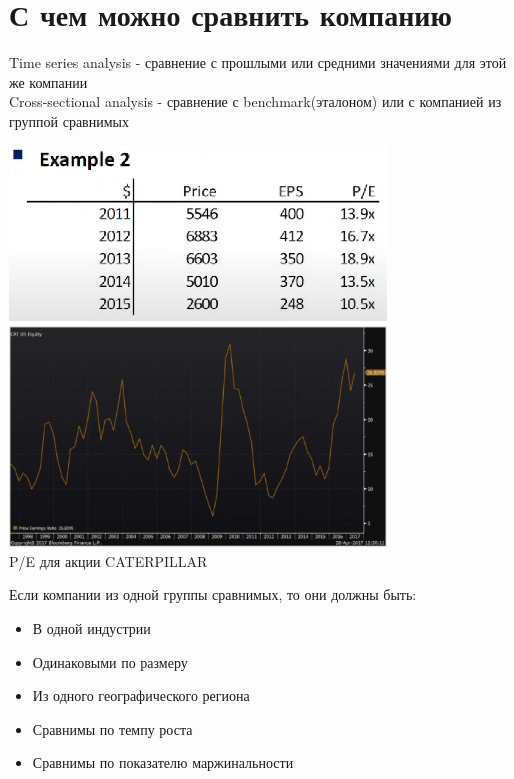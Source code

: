 \documentclass{article}
\begin{document}
\section{С чем можно сравнить компанию}
Time series analysis - сравнение с прошлыми или средними значениями для этой же компании\\
Cross-sectional analysis - сравнение с benchmark(эталоном) или с компанией из группой сравнимых\\
\begin{center}
\includegraphics[width=0.75\textwidth]{Example_2.png}\\
\includegraphics[width=0.75\textwidth]{Hisorical.png}\\
{P/E для акции CATERPILLAR}\
\end{center}
Если компании из одной группы сравнимых, то они должны быть:
\begin{itemize}
    \item В одной индустрии
    \item Одинаковыми по размеру
    \item Из одного географического региона
    \item Сравнимы по темпу роста
    \item Сравнимы по показателю маржинальности
\end{itemize}
\end{document}
